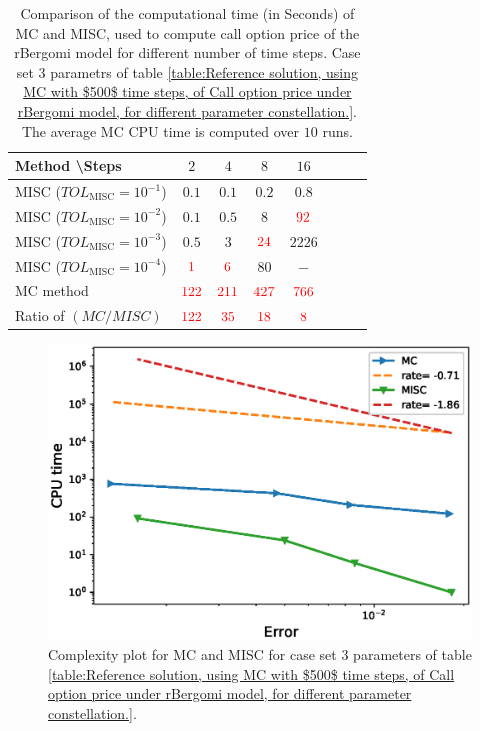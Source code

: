 \FloatBarrier
\begin{table}[h!]
	\centering
	\begin{tabular}{l*{6}{c}r}
		Method \textbackslash  Steps            & $2$ & $4$ & $8$ & $16$ &   \\
		\hline
		MISC ($TOL_{\text{MISC}}=10^{-1}$)  & $0.1$ & $0.1$ & $0.2$ & $0.8$ \\
		MISC ($TOL_{\text{MISC}}=10^{-2}$)  & $0.1$ & $0.5$ & $8$ & $\red{92}$ \\
		MISC ($TOL_{\text{MISC}}=10^{-3}$)  & $0.5$ & $3$ & $\red{24}$ & $2226$ \\
		MISC ($TOL_{\text{MISC}}=10^{-4}$)  & $\red{1}$ & $\red{6}$ & $80$ & $-$\\
		\hline
		MC method   & $ \red{122}
		
		$  & $  \red{211}$  & $  \red{427}$ & $ \red{766}
		$  \\	
		\hline
		Ratio of $\left(MC/MISC \right)$ & $ \red{122}
		
		$  & $  \red{35}$  & $  \red{  18
		}$ & $ \red{ 8}
		$  \\	
		
		\hline
	\end{tabular}
	\caption{Comparison of the computational time (in Seconds) of  MC and MISC, used to compute call option price of the rBergomi model for different number of time steps. Case set $3$ parametrs of table \ref{table:Reference solution, using MC with $500$ time steps, of Call option price under rBergomi model, for different parameter constellation.}. The average  MC CPU time is computed over $10$ runs. }
	\label{Comparsion of the computational time of  MC and MISC, used to compute Call option price of rBergomi model for different number of time steps. Case set3}
\end{table}
\FloatBarrier
	\begin{figure}[h!]
	\centering
	\includegraphics[width=0.4\linewidth]{./figures/rBergomi_Complexity_rates/set5/error_vs_time_set5}

	\caption{Complexity plot for   MC and MISC for case set $3$ parameters of table \ref{table:Reference solution, using MC with $500$ time steps, of Call option price under rBergomi model, for different parameter constellation.}.}
	\label{fig:Complexity plot for MC and MISC for Case set $3$ parameters}
\end{figure}



